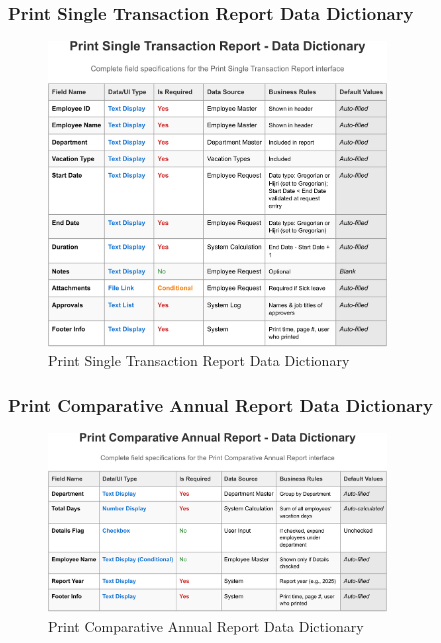 \documentclass[12pt,a4paper]{article}
\begin{document}
\subsubsection{Print Single Transaction Report Data Dictionary}
\begin{figure}[H]
\centering
\includegraphics[width=0.8\textwidth]{Data-Dictionary/Screen-Data-Dictionaries/Print-Single-Transaction-Report-Data-Dictionary/Print-Single-Transaction-Report-Data-Dictionary-1.png}
\caption{Print Single Transaction Report Data Dictionary}
\label{fig:print-single-transaction-data-dict}
\end{figure}

\subsubsection{Print Comparative Annual Report Data Dictionary}
\begin{figure}[H]
\centering
\includegraphics[width=0.8\textwidth]{Data-Dictionary/Screen-Data-Dictionaries/Print-Comparative-Annual-Report-Data-Dictionary/Print-Comparative-Annual-Report-Data-Dictionary-1.png}
\caption{Print Comparative Annual Report Data Dictionary}
\label{fig:print-comparative-annual-data-dict}
\end{figure}
\end{document}
